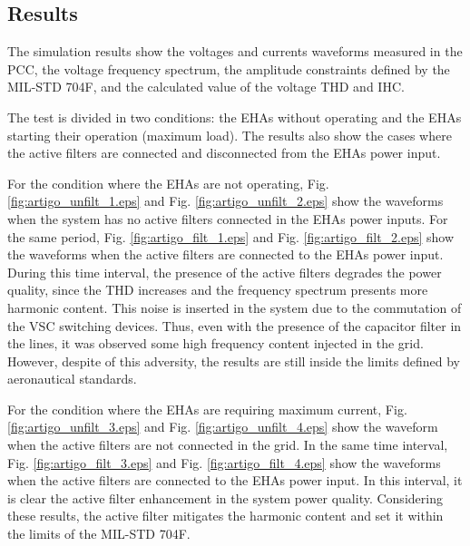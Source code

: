 \subsection{Results}

The simulation results show the voltages and currents waveforms measured in the PCC, the voltage frequency spectrum, the amplitude constraints defined by the MIL-STD 704F, and the calculated value of the voltage THD and IHC.

The test is divided in two conditions:  the EHAs without operating and the EHAs starting their operation (maximum load). The results also show the cases where the active filters are connected and disconnected from the EHAs power input.

For the condition where the EHAs are not operating, Fig. \ref{fig:artigo_unfilt_1.eps} and Fig. \ref{fig:artigo_unfilt_2.eps} show the waveforms when the system has no active filters connected in the EHAs power inputs. For the same period, Fig. \ref{fig:artigo_filt_1.eps} and Fig. \ref{fig:artigo_filt_2.eps} show the waveforms when the active filters are connected to the EHAs power input. During this time interval, the presence of the active filters degrades the power quality, since the THD increases and the frequency spectrum presents more harmonic content. 
This noise is inserted in the system due to the commutation of the VSC switching devices. Thus, even with the presence of the capacitor filter in the lines, it was observed some high frequency content injected in the grid. However, despite of this adversity, the results are still inside the limits defined by aeronautical standards.

For the condition where the EHAs are requiring maximum current, Fig. \ref{fig:artigo_unfilt_3.eps} and Fig. \ref{fig:artigo_unfilt_4.eps} show the waveform when the active filters are not connected in the grid. In the same time interval, Fig. \ref{fig:artigo_filt_3.eps} and Fig. \ref{fig:artigo_filt_4.eps} show the waveforms when the active filters are connected to the EHAs power input. In this interval, it is clear the active filter enhancement in the system power quality. Considering these results, the active filter mitigates the harmonic content and set it within the limits of the MIL-STD 704F.

